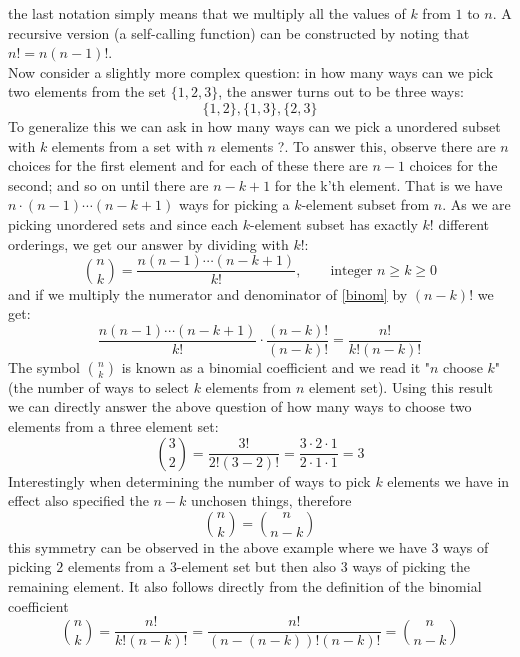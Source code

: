 the last notation simply means that we multiply all the values of $k$ from $1$
to $n$. A recursive version (a self-calling function) can be constructed by
noting that $n! = n(n-1)!$. \\

\myindent Now consider a slightly more complex question: in how many ways can
we pick two elements from the set $\{1,2,3\}$, the answer turns out to be three
ways:
\[
\{1, 2\}, \{1, 3\}, \{2, 3\}
\]
To generalize this we can ask in how many ways can we pick a unordered subset
with $k$ elements from a set with $n$ elements ?. To answer this, observe there
are $n$ choices for the first element and for each of these there are $n - 1$
choices for the second; and so on until there are $n - k + 1$ for the k'th
element. That is we have $n \cdot (n-1) \cdots (n - k + 1)$ ways for picking a
$k$-element subset from $n$. As we are picking unordered sets and since each
$k$-element subset has exactly $k!$ different orderings, we get our answer by
dividing with $k!$:
\begin{equation}\label{binom}
\binom{n}{k} = \frac{n(n-1) \cdots (n - k + 1)}{k!},  \qquad \text{integer } n \geq k \geq 0
\end{equation}
and if we multiply the numerator and denominator of \ref{binom} by $(n - k)!$ we get:
\[
\frac{n(n-1) \cdots (n - k + 1)}{k!} \cdot \frac{(n - k)!}{(n - k)!} =  \frac{n!}{k!(n-k)!}
\]
The symbol $\binom{n}{k}$ is known as a binomial coefficient and we read it
"$n$ choose $k$" (the number of ways to select $k$ elements from $n$ element
set). Using this result we can directly answer the above question of how many
ways to choose two elements from a three element set:
\[
\binom{3}{2}  = \frac{3!}{2! (3-2)!} = \frac{3 \cdot 2 \cdot 1}{2 \cdot 1 \cdot 1} = 3
\]
Interestingly when determining the number of ways to pick $k$ elements we have
in effect also specified the $n-k$ unchosen things, therefore
\begin{equation}\label{binom_symmetry}
\binom{n}{k} = \binom{n}{n-k}
\end{equation}
this symmetry can be observed in the above example where we have $3$ ways of
picking $2$ elements from a $3$-element set but then also $3$ ways of picking
the remaining element. It also follows directly from the definition of the
binomial coefficient
\[
\binom{n}{k} =  \frac{n!}{k!(n-k)!} =  \frac{n!}{(n-(n-k))!(n-k)!} = \binom{n}{n-k}
\]

